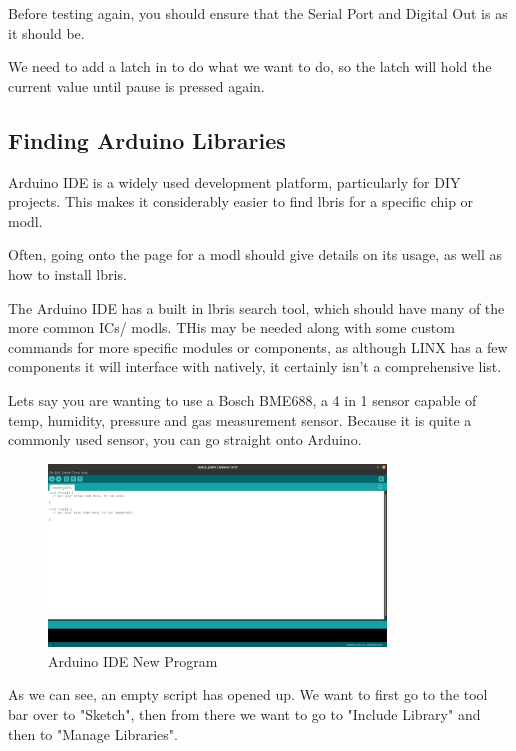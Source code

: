 \documentclass[a4paper,11pt]{report}
\begin{document}
Before testing again, you should ensure that the Serial Port and Digital Out is as it should be.

We need to add a latch in to do what we want to do, so the latch will hold the current value until pause is pressed again.

\subsection{Finding Arduino Libraries}

Arduino IDE is a widely used development platform, particularly for DIY projects. This makes it considerably easier to find \gls{lbris} for a specific chip or \gls{modl}.

Often, going onto the page for a \gls{modl} should give details on its usage, as well as how to install \gls{lbris}.

The Arduino IDE has a built in \gls{lbris} search tool, which should have many of the more common ICs/ \gls{modl}s. THis may be needed along with some custom commands for more specific modules or components, as although LINX has a few components it will interface with natively, it certainly isn't a comprehensive list.

Lets say you are wanting to use a Bosch BME688, a 4 in 1 sensor capable of temp, humidity, pressure and gas measurement sensor. Because it is quite a commonly used sensor, you can go straight onto Arduino.

\begin{figure}[H]
\centering
\includegraphics[width=0.8\textwidth]{screenshots/arduinoidestartup}
\caption{Arduino IDE New Program}
\end{figure}

As we can see, an empty script has opened up. We want to first go to the tool bar over to "Sketch", then from there we want to go to "Include Library" and then to "Manage Libraries".
\end{document}
